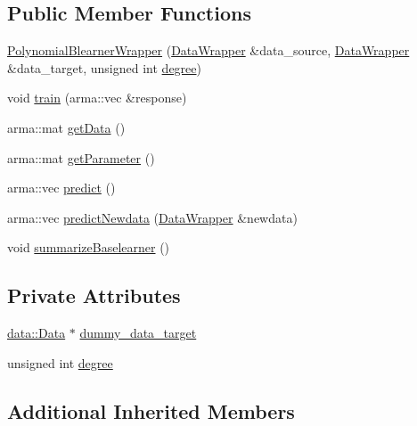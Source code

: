 \subsection*{Public Member Functions}
\begin{DoxyCompactItemize}
\item 
\mbox{\hyperlink{class_polynomial_blearner_wrapper_a07ad5a828b4a46bb2f6a2a6fc56b8f1a}{Polynomial\+Blearner\+Wrapper}} (\mbox{\hyperlink{class_data_wrapper}{Data\+Wrapper}} \&data\+\_\+source, \mbox{\hyperlink{class_data_wrapper}{Data\+Wrapper}} \&data\+\_\+target, unsigned int \mbox{\hyperlink{class_polynomial_blearner_wrapper_aaf529e97ffbb9cdd2822957b5f6b5b0c}{degree}})
\item 
void \mbox{\hyperlink{class_polynomial_blearner_wrapper_a7e6cdfd15c354b76ddd217c76b3cfbc5}{train}} (arma\+::vec \&response)
\item 
arma\+::mat \mbox{\hyperlink{class_polynomial_blearner_wrapper_a56c92d1dee5e610657437766c13a6a5d}{get\+Data}} ()
\item 
arma\+::mat \mbox{\hyperlink{class_polynomial_blearner_wrapper_a40ee4c7ab2c7230d96577d3a588b262f}{get\+Parameter}} ()
\item 
arma\+::vec \mbox{\hyperlink{class_polynomial_blearner_wrapper_a24469ccf334749669dc1ee809263dfb2}{predict}} ()
\item 
arma\+::vec \mbox{\hyperlink{class_polynomial_blearner_wrapper_aa3e9670a1e8efe6524e7bdf10a43e25c}{predict\+Newdata}} (\mbox{\hyperlink{class_data_wrapper}{Data\+Wrapper}} \&newdata)
\item 
void \mbox{\hyperlink{class_polynomial_blearner_wrapper_ad1eaf84c973c702c999af43fc23aeca2}{summarize\+Baselearner}} ()
\end{DoxyCompactItemize}
\subsection*{Private Attributes}
\begin{DoxyCompactItemize}
\item 
\mbox{\hyperlink{classdata_1_1_data}{data\+::\+Data}} $\ast$ \mbox{\hyperlink{class_polynomial_blearner_wrapper_a4d3becc6b8cdfe2e1406611aad5b0d2c}{dummy\+\_\+data\+\_\+target}}
\item 
unsigned int \mbox{\hyperlink{class_polynomial_blearner_wrapper_aaf529e97ffbb9cdd2822957b5f6b5b0c}{degree}}
\end{DoxyCompactItemize}
\subsection*{Additional Inherited Members}



